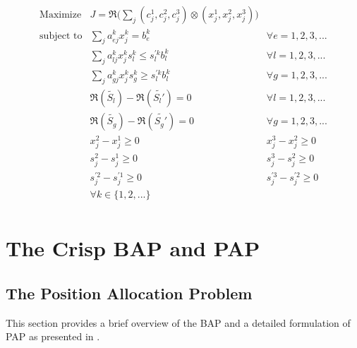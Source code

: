 \documentclass[11pt,a4paper,final]{article}
\begin{document}
\begin{equation}
\label{eq:kumar-kaurs-crisp}
\begin{array}{lll}
\text{Maximize}    & J = \mathfrak{R}\Big(\sum_j (c_j^1,c_j^2,c_j^3) \otimes (x_j^1,x_j^2,x_j^3)\Big) &                       \\
\text{subject to}  & \sum_j a_{ej}^k x_j^k = b_e^k                                   &  \forall e = 1,2,3,...      \\
                   & \sum_j a_{lj}^k x_j^k s_l^k \le s_l^{'k} b_l^k                    &  \forall l = 1,2,3,...      \\
                   & \sum_j a_{gj}^k x_j^k s_g^k \ge s_l^{'k} b_l^k                    &  \forall g = 1,2,3,...      \\
                   & \mathfrak{R}(\tilde{S_l}) - \mathfrak{R}(\tilde{S_l'}) = 0                         & \forall l = 1,2,3,...       \\
                   & \mathfrak{R}(\tilde{S_g}) - \mathfrak{R}(\tilde{S_g'}) = 0                         & \forall g = 1,2,3,...       \\
                   & x_j^2 - x_j^1 \ge 0                                            & x_j^3 - x_j^2 \ge 0     \\
                   & s_j^2 - s_j^1 \ge 0                                            & s_j^3 - s_j^2 \ge 0     \\
                   & s_j^{'2} - s_j^{'1} \ge 0                                      & s_j^{'3} - s_j^{'2} \ge 0 \\
                   & \forall k \in \{1,2,...\}                                            &                       \\
\end{array}
\end{equation}

\section{The Crisp BAP and PAP}
\label{sec:org72d88cb}
\subsection{The Position Allocation Problem}
\label{sec:the-position-allocation-problem}
This section provides a brief overview of the BAP and a detailed formulation of PAP as presented in
\cite{qarebagh-2019-optim-sched}.
\end{document}
